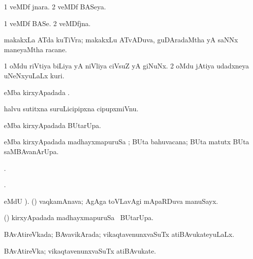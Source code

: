 {{{{{{\bentry
{} 
\gl{\gu}
\expl{}
\bmng
\bnum
\num{1} veMDf jnara. 
\num{2} veMDf BASeya. 
\enum
\emng
\eentry

\bentry
{} 
\gl{\nA}
\expl{}
\bmng
\bnum
\num{1} veMDf BASe. 
\num{2} veMDfjna. 
\enum
\emng
\eentry

\bentry
{} 
\gl{\nA}
\expl{}
\bmng
makakxLa ATda kuTiVra; makakxLu ATvADuva, guDAradaMtha yA saNNx maneyaMtha racane. 
\emng
\eentry

\bentry
{} 
\gl{\nA}
\expl{}
\bmng
\bnum
\num{1} oMdu riVtiya biLiya yA niVliya ciVsuZ yA giNuNx. 
\num{2} oMdu jAtiya udadxneya uNeNxyuLaLx kuri. 
\enum
\emng
\eentry

\bentry
{} 
\gl{\kirx}
\expl{}
\bmng
{} eMba kirxyApadada \BU. 
\emng
\eentry

\bentry
{} 
\gl{\nA}
\expl{}
\bmng
halvu sutitxna suruLicipipxna cipupxmiVnu. 
\emng
\eentry

\bentry
{} 
\gl{\kirx}
\expl{}
\bmng
{} eMba kirxyApadada BUtarUpa. 
\emng
\eentry

\bentry
{} 
\gl{\kirx}
\expl{}
\bmng
{} eMba kirxyApadada madhayxmapuruSa \Eva; BUta bahuvacana; BUta matutx BUta saMBAvanArUpa. 
\emng
\eentry

\bentry
{} 
\bmng
{}. 
\emng
\eentry

\bentry
{} 
\expl{}
\bmng
{}. 
\emng
\eentry

\bentry
{} 
\gl{\nA}
\bmng
{} eMdU \parx). (\pu) vaqkamAnava; AgAga toVLavAgi mApaRDuva manuSayx. 
\emng
\eentry

\bentry
{} 
\gl{\kirx}
\expl{}
\bmng
(\pArxparx)  kirxyApadada madhayxmapuruSa \Eva\ BUtarUpa. 
\emng
\eentry

\bentry
{} 
\gl{\gu}
\expl{}
\bmng
BAvAtireVkada; BAvavikArada; vikaqtavenunxvaSuTx atiBAvukateyuLaLx. 
\emng
\eentry

\bentry
{} 
\gl{\nA}
\expl{}
\bmng
BAvAtireVka; vikaqtavenunxvaSuTx atiBAvukate. 
\emng
\eentry

}}}}}}
